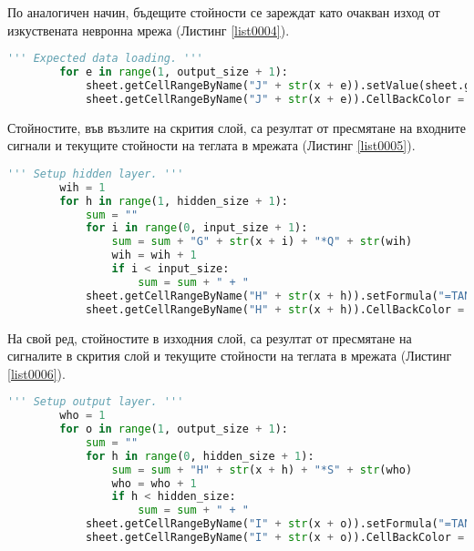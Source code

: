 По аналогичен начин, бъдещите стойности се зареждат като очакван изход от изкуствената невронна мрежа (Листинг \ref{list0004}).

\begin{lstlisting}[caption=Очакван изход от мрежата, language=Python, basicstyle=\tiny, label=list0004]
        ''' Expected data loading. '''
        for e in range(1, output_size + 1):
            sheet.getCellRangeByName("J" + str(x + e)).setValue(sheet.getCellRangeByName("E" + str(t + e + input_size)).getValue())
            sheet.getCellRangeByName("J" + str(x + e)).CellBackColor = (0 << 16 | 127 << 8 | 0)
\end{lstlisting}

Стойностите, във възлите на скрития слой, са резултат от пресмятане на входните сигнали и текущите стойности на теглата в мрежата (Листинг \ref{list0005}). 

\begin{lstlisting}[caption=Стойности на скрития слой при правия пас, language=Python, basicstyle=\tiny, label=list0005]
        ''' Setup hidden layer. '''
        wih = 1
        for h in range(1, hidden_size + 1):
            sum = ""
            for i in range(0, input_size + 1):
                sum = sum + "G" + str(x + i) + "*Q" + str(wih)
                wih = wih + 1
                if i < input_size:
                    sum = sum + " + "
            sheet.getCellRangeByName("H" + str(x + h)).setFormula("=TANH( " + sum + " )")
            sheet.getCellRangeByName("H" + str(x + h)).CellBackColor = (0 << 16 | 0 << 8 | 255)
\end{lstlisting}

На свой ред, стойностите в изходния слой, са резултат от пресмятане на сигналите в скрития слой и текущите стойности на теглата в мрежата (Листинг \ref{list0006}).

\begin{lstlisting}[caption=Стойности на изходния слой при правия пас, language=Python, basicstyle=\tiny, label=list0006]
        ''' Setup output layer. '''
        who = 1
        for o in range(1, output_size + 1):
            sum = ""
            for h in range(0, hidden_size + 1):
                sum = sum + "H" + str(x + h) + "*S" + str(who)
                who = who + 1
                if h < hidden_size:
                    sum = sum + " + "
            sheet.getCellRangeByName("I" + str(x + o)).setFormula("=TANH( " + sum + " )")
            sheet.getCellRangeByName("I" + str(x + o)).CellBackColor = (0 << 16 | 255 << 8 | 0)
\end{lstlisting}

